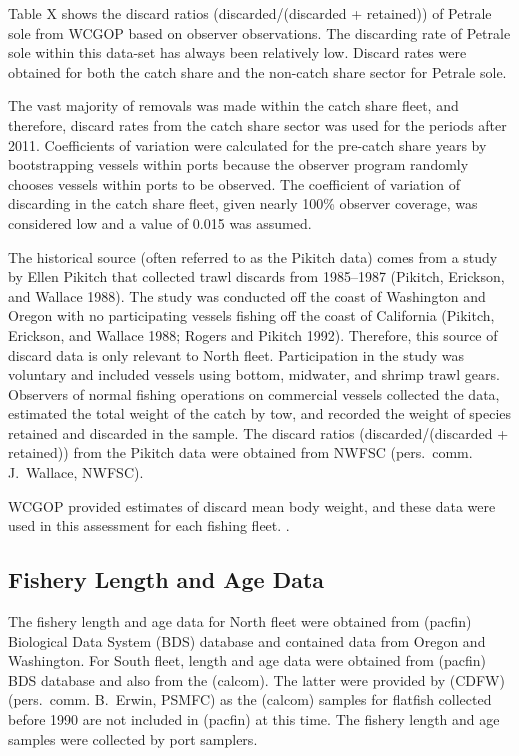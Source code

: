 \documentclass[
]{scrartcl}
\begin{document}
Table X shows the discard ratios (discarded/(discarded + retained)) of
Petrale sole from WCGOP based on observer observations. The discarding
rate of Petrale sole within this data-set has always been relatively
low. Discard rates were obtained for both the catch share and the
non-catch share sector for Petrale sole.

The vast majority of removals was made within the catch share fleet, and
therefore, discard rates from the catch share sector was used for the
periods after 2011. Coefficients of variation were calculated for the
pre-catch share years by bootstrapping vessels within ports because the
observer program randomly chooses vessels within ports to be observed.
The coefficient of variation of discarding in the catch share fleet,
given nearly 100\% observer coverage, was considered low and a value of
0.015 was assumed.

The historical source (often referred to as the Pikitch data) comes from
a study by Ellen Pikitch that collected trawl discards from 1985--1987
(Pikitch, Erickson, and Wallace 1988). The study was conducted off the
coast of Washington and Oregon with no participating vessels fishing off
the coast of California (Pikitch, Erickson, and Wallace 1988; Rogers and
Pikitch 1992). Therefore, this source of discard data is only relevant
to North fleet. Participation in the study was voluntary and included
vessels using bottom, midwater, and shrimp trawl gears. Observers of
normal fishing operations on commercial vessels collected the data,
estimated the total weight of the catch by tow, and recorded the weight
of species retained and discarded in the sample. The discard ratios
(discarded/(discarded + retained)) from the Pikitch data were obtained
from NWFSC (pers.\ comm. J.\ Wallace, NWFSC).

WCGOP provided estimates of discard mean body weight, and these data
were used in this assessment for each fishing fleet. .

\subsection{Fishery Length and Age
Data}\label{fishery-length-and-age-data}

The fishery length and age data for North fleet were obtained from
(\textsf{pacfin}) Biological Data System (BDS) database and contained data from
Oregon and Washington. For South fleet, length and age data were
obtained from (\textsf{pacfin}) BDS database and also from the (\textsf{calcom}). The
latter were provided by (CDFW) (pers.\ comm. B.\ Erwin, PSMFC) as the
(\textsf{calcom}) samples for flatfish collected before 1990 are not included in
(\textsf{pacfin}) at this time. The fishery length and age samples were collected
by port samplers.
\end{document}
